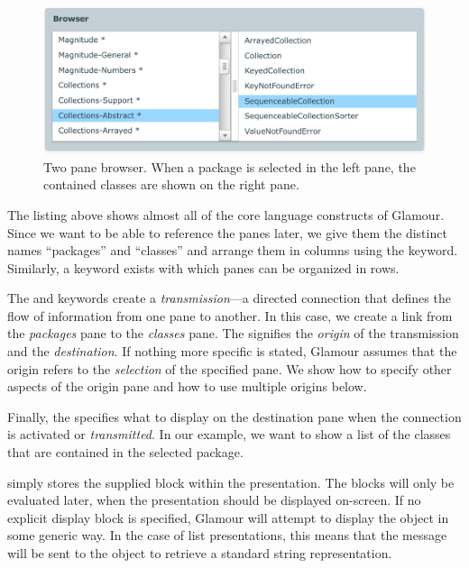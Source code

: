 \documentclass[a4paper,10pt,twoside]{book}
\begin{document}
\begin{figure}[htbp]
\centerline{\includegraphics[width=\linewidth]{showclasses.pdf}}
\caption{Two pane browser. When a package is selected in the left
  pane, the contained classes are shown on the right pane.}
\label{fig:showclasses}
\end{figure}

The listing above shows almost all of the core language constructs of
Glamour. Since we want to be able to reference the panes later, we
give them the distinct names ``packages'' and ``classes'' and arrange them
in columns using the  keyword. Similarly, a 
keyword exists with which panes can be organized in rows.

The  and  keywords create a
\emph{transmission}---a directed connection that defines the flow of
information from one pane to another. In this case, we create a link
from the \emph{packages} pane to the \emph{classes} pane. The
 signifies the \emph{origin} of the transmission and
 the \emph{destination}. If nothing more specific is
stated, Glamour assumes that the origin refers to the \emph{selection}
of the specified pane. We show how to specify other aspects of the
origin pane and how to use multiple origins below.

Finally, the  specifies what to display on the destination
pane when the connection is activated or \emph{transmitted}. In our
example, we want to show a list of the classes that are contained in
the selected package.

 simply stores the supplied block within the
presentation. The blocks will only be evaluated later, when the
presentation should be displayed on-screen. If no explicit display
block is specified, Glamour will attempt to display the object in some
generic way. In the case of list presentations, this means that the
 message will be sent to the object to retrieve a
standard string representation.
\end{document}
